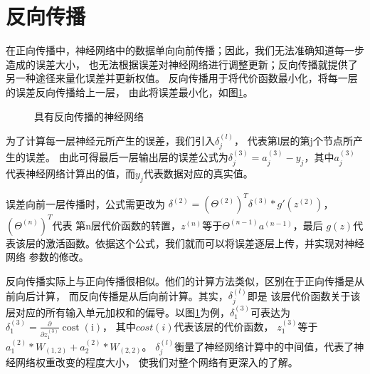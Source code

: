 \section{反向传播}
在正向传播中，神经网络中的数据单向向前传播；因此，我们无法准确知道每一步造成的误差大小，
也无法根据误差对神经网络进行调整更新；反向传播就提供了另一种途径来量化误差并更新权值。
反向传播用于将代价函数最小化，将每一层的误差反向传播给上一层，
由此将误差最小化，如图\ref{back_propagate_picture}。


\begin{figure}[!h]
    \begin{center}
    \caption{具有反向传播的神经网络}
    \label{back_propagate_picture}
    \end{center}
\end{figure}


为了计算每一层神经元所产生的误差，我们引入$\delta_{j}^{(l)}$，
代表第l层的第j个节点所产生的误差。
由此可得最后一层输出层的误差公式为$\delta_{j}^{(3)}=a_{j}^{(3)}-y_{j}$，其中$a_{j}^{(3)}$
代表神经网络计算出的值，而$y_{j}$代表数据对应的真实值。

误差向前一层传播时，公式需更改为
$\delta^{(2)}=(\Theta^{(2)})^{T}\delta^{(3)}*g'(z^{(2)})$，$(\Theta^{(n)})^T$代表
第n层代价函数的转置，$z^{(n)}$等于$\Theta^{(n-1)} a^{(n-1)}$，最后
$g(z)$代表该层的激活函数。依据这个公式，我们就而可以将误差逐层上传，并实现对神经网络
参数的修改。

反向传播实际上与正向传播很相似。他们的计算方法类似，区别在于正向传播是从前向后计算，
而反向传播是从后向前计算。其实，$\delta_{j}^{(l)}$即是
该层代价函数关于该层对应的所有输入单元加权和的偏导。以图\ref{back_propagate_picture}为例，$\delta_{1}^{(3)}$可表达为
$\delta_{1}^{(3)}=\frac{\partial}{\partial z_{1}^{(3)}} \operatorname{cost}(\mathrm{i})$，
其中$cost(i)$代表该层的代价函数，
$z_{1}^{(3)}$等于$a_{1}^{(2)}*W_{(1,2)}+a_{2}^{(2)}*W_{(2,2)}$。
$\delta_{j}^{(l)}$衡量了神经网络计算中的中间值，代表了神经网络权重改变的程度大小，
使我们对整个网络有更深入的了解。

